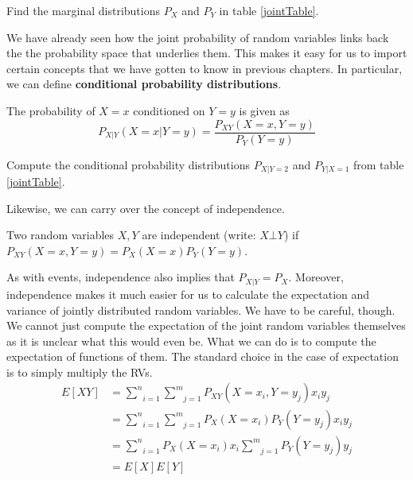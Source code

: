 \documentclass[a4paper,11pt,leqno]{report}
\begin{document}
\begin{Exercise}
Find the marginal distributions $ P_{X} $ and $ P_{Y} $ in table \ref{jointTable}.
\end{Exercise}

We have already seen how the joint probability of random variables links back the the probability space that underlies them.
This makes it easy for us to import certain concepts that we have gotten to know in previous chapters. In particular, we can
define \textbf{conditional probability distributions}.

\begin{Definition}
The probability of $ X = x $ conditioned on $ Y=y $ is given as
$$ P_{X|Y}(X=x|Y=y) = \dfrac{P_{XY}(X=x, Y=y)}{P_{Y}(Y=y)} $$
\end{Definition} 

\begin{Exercise}
Compute the conditional probability distributions $ P_{X|Y=2} $ and $ P_{Y|X=1} $ from table \ref{jointTable}.
\end{Exercise}

Likewise, we can carry over the concept of independence.

\begin{Definition}
Two random variables $ X,Y $ are independent (write: $ X \bot Y $) if $ P_{XY}(X=x, Y=y) = P_{X}(X=x)P_{Y}(Y=y) $.
\end{Definition}

As with events, independence also implies that $ P_{X|Y} = P_{X} $. Moreover, independence makes it much easier for us
to calculate the expectation and variance of jointly distributed random variables. We have to be careful, though. We
cannot just compute the expectation of the joint random variables themselves as it is unclear what this would even be.
What we can do is to compute the expectation of functions of them. The standard choice in the case of expectation
is to simply multiply the RVs.
\begin{align}
E[XY] &= \underset{i=1}{\overset{n}{\sum}}\underset{j=1}{\overset{m}{\sum}} P_{XY}(X=x_{i},Y=y_{j}) x_{i}y_{j} \\
&= \underset{i=1}{\overset{n}{\sum}}\underset{j=1}{\overset{m}{\sum}} P_{X}(X=x_{i})P_{Y}(Y=y_{j}) x_{i}y_{j} \\
&= \underset{i=1}{\overset{n}{\sum}}P_{X}(X=x_{i})x_{i} \underset{j=1}{\overset{m}{\sum}} P_{Y}(Y=y_{j}) y_{j} \\
&= E[X]E[Y]
\end{align}
\end{document}
